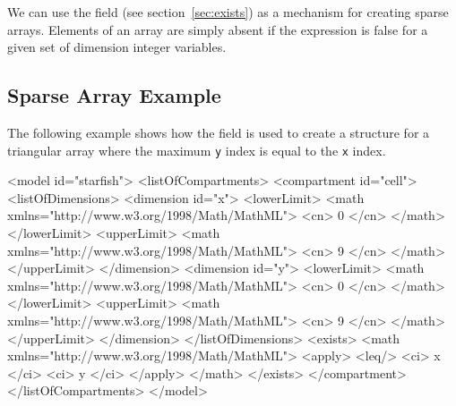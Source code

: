 \documentclass{cekarticle}
\begin{document}
We can use the  field (see section~\ref{sec:exists}) 
as a mechanism for creating sparse arrays.  Elements of an array
are simply absent if the  expression is false for a given
set of dimension integer variables.

\subsection{Sparse Array Example}
\label{sec:sparseeg}

The following example shows how the  field is used to create a structure for a triangular
array where the maximum \texttt{y} index is equal to the
\texttt{x} index.

\begin{example}
<model id="starfish">
    <listOfCompartments>
        <compartment id="cell">
            <listOfDimensions>
                <dimension id="x">
                    <lowerLimit>
                        <math xmlns="http://www.w3.org/1998/Math/MathML">
                            <cn> 0 </cn>
                        </math>
                    </lowerLimit>
                    <upperLimit>
                        <math xmlns="http://www.w3.org/1998/Math/MathML">
                            <cn> 9 </cn>
                        </math>
                    </upperLimit>
                </dimension>
                <dimension id="y">
                    <lowerLimit>
                        <math xmlns="http://www.w3.org/1998/Math/MathML">
                            <cn> 0 </cn>
                        </math>
                    </lowerLimit>
                    <upperLimit>
                        <math xmlns="http://www.w3.org/1998/Math/MathML">
                            <cn> 9 </cn>
                        </math>
                    </upperLimit>
                </dimension>
            </listOfDimensions>
            <exists>
                <math xmlns="http://www.w3.org/1998/Math/MathML">
                    <apply>
                        <leq/>
                        <ci> x </ci>
                        <ci> y </ci>
                    </apply>
                </math>
            </exists>
        </compartment>
    </listOfCompartments>
</model>
\end{example}
\end{document}
